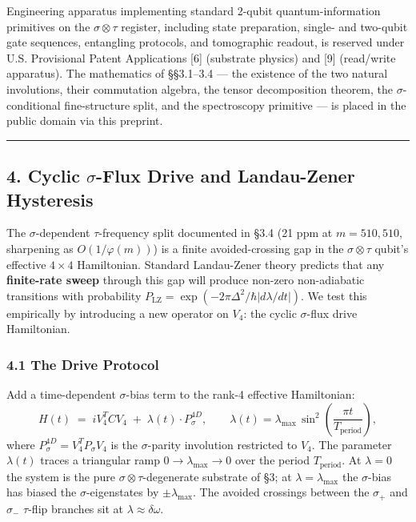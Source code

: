 \documentclass[
]{article}
\begin{document}
Engineering apparatus implementing standard 2-qubit quantum-information
primitives on the \(\sigma\otimes\tau\) register, including state
preparation, single- and two-qubit gate sequences, entangling protocols,
and tomographic readout, is reserved under U.S. Provisional Patent
Applications {[}6{]} (substrate physics) and {[}9{]} (read/write
apparatus). The mathematics of §§3.1--3.4 --- the existence of the two
natural involutions, their commutation algebra, the tensor decomposition
theorem, the \(\sigma\)-conditional fine-structure split, and the
spectroscopy primitive --- is placed in the public domain via this
preprint.

\begin{center}\rule{0.5\linewidth}{0.5pt}\end{center}

\subsection{\texorpdfstring{4. Cyclic \(\sigma\)-Flux Drive and
Landau-Zener
Hysteresis}{4. Cyclic \textbackslash sigma-Flux Drive and Landau-Zener Hysteresis}}\label{cyclic-sigma-flux-drive-and-landau-zener-hysteresis}

The \(\sigma\)-dependent \(\tau\)-frequency split documented in §3.4 (21
ppm at \(m = 510{,}510\), sharpening as \(O(1/\varphi(m))\)) is a finite
avoided-crossing gap in the \(\sigma\otimes\tau\) qubit's effective
\(4 \times 4\) Hamiltonian. Standard Landau-Zener theory predicts that
any \textbf{finite-rate sweep} through this gap will produce non-zero
non-adiabatic transitions with probability
\(P_\text{LZ} = \exp(-2\pi\Delta^2 / \hbar |d\lambda/dt|)\). We test
this empirically by introducing a new operator on \(V_4\): the cyclic
\(\sigma\)-flux drive Hamiltonian.

\subsubsection{4.1 The Drive Protocol}\label{the-drive-protocol}

Add a time-dependent \(\sigma\)-bias term to the rank-4 effective
Hamiltonian:
\[H(t) \;=\; i V_4^T C V_4 \;+\; \lambda(t) \cdot P_\sigma^{4D}, \qquad \lambda(t) = \lambda_\text{max} \, \sin^2\!\left(\frac{\pi t}{T_\text{period}}\right), \tag{4.1}\]
where \(P_\sigma^{4D} = V_4^T P_\sigma V_4\) is the \(\sigma\)-parity
involution restricted to \(V_4\). The parameter \(\lambda(t)\) traces a
triangular ramp \(0 \to \lambda_\text{max} \to 0\) over the period
\(T_\text{period}\). At \(\lambda = 0\) the system is the pure
\(\sigma\otimes\tau\)-degenerate substrate of §3; at
\(\lambda = \lambda_\text{max}\) the \(\sigma\)-bias has biased the
\(\sigma\)-eigenstates by \(\pm \lambda_\text{max}\). The avoided
crossings between the \(\sigma_+\) and \(\sigma_-\) \(\tau\)-flip
branches sit at \(\lambda \approx \delta\omega\).
\end{document}
